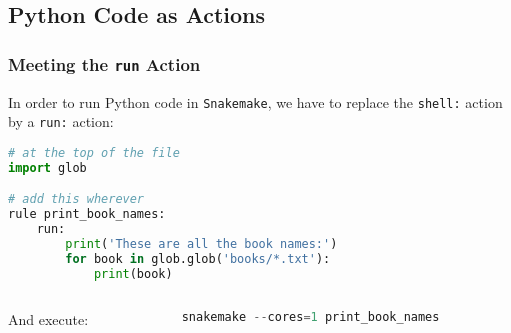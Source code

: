\subsection{Python Code as Actions}

\begin{frame}[fragile]
  \frametitle{Meeting the \texttt{run} Action}
  \vspace{-0.5em}
  In order to run Python code in \texttt{Snakemake}, we have to replace the \texttt{shell:} action by a \texttt{run:} action:\vspace{-0.5em}
  \vspace{-0.5em}
  \begin{lstlisting}[language=Python,style=Python]
# at the top of the file
import glob

# add this wherever
rule print_book_names:
    run:
        print('These are all the book names:')
        for book in glob.glob('books/*.txt'):
            print(book)

  \end{lstlisting}\vspace{-0.5em}
  \begin{columns}
   \begin{column}{0.2\textwidth}
    And execute:
   \end{column}
   \begin{column}{0.8\textwidth}
\begin{lstlisting}[language=Python,style=Python]
snakemake --cores=1 print_book_names
  \end{lstlisting}
   \end{column}
  \end{columns}

\end{frame}

